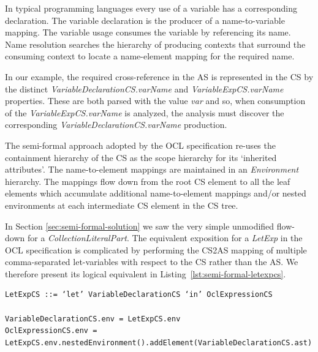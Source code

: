 \documentclass{llncs}
\begin{document}

In typical programming languages every use of a variable has a corresponding declaration. The variable declaration is the producer of a name-to-variable mapping. The variable usage consumes the variable by referencing its name. Name resolution searches the hierarchy of producing contexts that surround the consuming context to locate a name-element mapping for the required name.

In our example, the required cross-reference in the AS is represented in the CS by the distinct \emph{VariableDeclarationCS.varName} and \emph{VariableExpCS.varName} properties. These are both parsed with the value \emph{var} and so, when consumption of the \emph{VariableExpCS.varName} is analyzed, the analysis must discover the corresponding \emph{VariableDeclarationCS.varName} production.

The semi-formal approach adopted by the OCL specification re-uses the containment hierarchy of the CS as the scope hierarchy for its `inherited attributes'. The name-to-element mappings are maintained in an \emph{Environment} hierarchy. The mappings flow down from the root CS element to all the leaf elements which accumulate additional name-to-element mappings and/or nested environments at each intermediate CS element in the CS tree.

In Section \ref{sec:semi-formal-solution} we saw the very simple unmodified flow-down for a \emph{CollectionLiteralPart}. The equivalent exposition for a \emph{LetExp} in the OCL specification is complicated by performing the CS2AS mapping of multiple comma-separated let-variables with respect to the CS rather than the AS. We therefore present its logical equivalent in Listing~\ref{lst:semi-formal-letexpcs}.

\begin{lstlisting}[caption=Semi-formal LetExpCS equivalent, label=lst:semi-formal-letexpcs, language=OCL]
LetExpCS ::= ‘let’ VariableDeclarationCS ‘in’ OclExpressionCS

VariableDeclarationCS.env = LetExpCS.env
OclExpressionCS.env = LetExpCS.env.nestedEnvironment().addElement(VariableDeclarationCS.ast)
\end{lstlisting}
\end{document}
